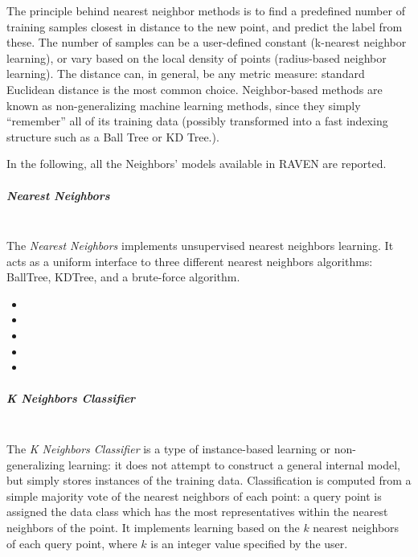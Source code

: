 The principle behind nearest neighbor methods is to find a predefined number of
training samples closest in distance to the new point, and predict the label
from these.
%
The number of samples can be a user-defined constant (k-nearest neighbor
learning), or vary based on the local density of points (radius-based neighbor
learning).
%
The distance can, in general, be any metric measure: standard Euclidean distance
is the most common choice.
%
Neighbor-based methods are known as non-generalizing machine learning methods,
since they simply ``remember'' all of its training data (possibly transformed
into a fast indexing structure such as a Ball Tree or KD Tree.).

In the following, all the Neighbors' models available in RAVEN are reported.
%
\subparagraph{Nearest Neighbors}
\mbox{}
\\The \textit{Nearest Neighbors} implements unsupervised nearest neighbors
learning.
%
It acts as a uniform interface to three different nearest neighbors algorithms:
BallTree, KDTree, and a brute-force algorithm.
%
\begin{itemize}
  \item {}
  \item {}
  \item {}
  \item {}
  \item {}
\end{itemize}
\subparagraph{K Neighbors Classifier}
\mbox{}
\\The \textit{K Neighbors Classifier} is a type of instance-based learning or
non-generalizing learning: it does not attempt to construct a general internal
model, but simply stores instances of the training data.
%
Classification is computed from a simple majority vote of the nearest neighbors
of each point: a query point is assigned the data class which has the most
representatives within the nearest neighbors of the point.
%
It implements learning based on the $k$ nearest neighbors of each query point,
where $k$ is an integer value specified by the user.

